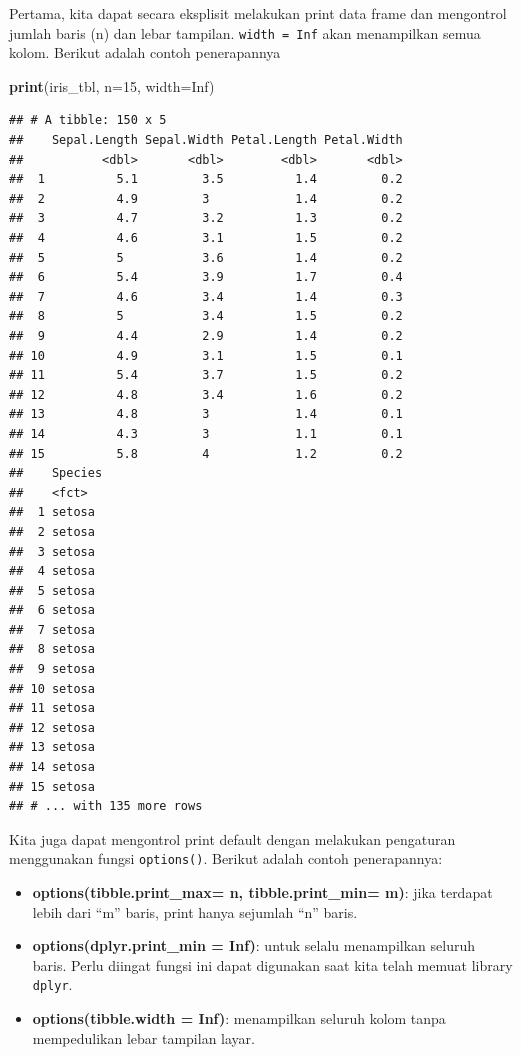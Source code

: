 \documentclass[]{book}
\newenvironment{Shaded}{\begin{snugshade}}{\end{snugshade}}
\newcommand{\KeywordTok}[1]{\textcolor[rgb]{0.13,0.29,0.53}{\textbf{#1}}}
\newcommand{\DataTypeTok}[1]{\textcolor[rgb]{0.13,0.29,0.53}{#1}}
\newcommand{\DecValTok}[1]{\textcolor[rgb]{0.00,0.00,0.81}{#1}}
\newcommand{\OtherTok}[1]{\textcolor[rgb]{0.56,0.35,0.01}{#1}}
\newcommand{\NormalTok}[1]{#1}
\providecommand{\tightlist}{%
  \setlength{\itemsep}{0pt}\setlength{\parskip}{0pt}}
\begin{document}
Pertama, kita dapat secara eksplisit melakukan print data frame dan
mengontrol jumlah baris (n) dan lebar tampilan. \texttt{width\ =\ Inf}
akan menampilkan semua kolom. Berikut adalah contoh penerapannya

\begin{Shaded}
\begin{Highlighting}[]
\KeywordTok{print}\NormalTok{(iris_tbl, }\DataTypeTok{n=}\DecValTok{15}\NormalTok{, }\DataTypeTok{width=}\OtherTok{Inf}\NormalTok{)}
\end{Highlighting}
\end{Shaded}

\begin{verbatim}
## # A tibble: 150 x 5
##    Sepal.Length Sepal.Width Petal.Length Petal.Width
##           <dbl>       <dbl>        <dbl>       <dbl>
##  1          5.1         3.5          1.4         0.2
##  2          4.9         3            1.4         0.2
##  3          4.7         3.2          1.3         0.2
##  4          4.6         3.1          1.5         0.2
##  5          5           3.6          1.4         0.2
##  6          5.4         3.9          1.7         0.4
##  7          4.6         3.4          1.4         0.3
##  8          5           3.4          1.5         0.2
##  9          4.4         2.9          1.4         0.2
## 10          4.9         3.1          1.5         0.1
## 11          5.4         3.7          1.5         0.2
## 12          4.8         3.4          1.6         0.2
## 13          4.8         3            1.4         0.1
## 14          4.3         3            1.1         0.1
## 15          5.8         4            1.2         0.2
##    Species
##    <fct>  
##  1 setosa 
##  2 setosa 
##  3 setosa 
##  4 setosa 
##  5 setosa 
##  6 setosa 
##  7 setosa 
##  8 setosa 
##  9 setosa 
## 10 setosa 
## 11 setosa 
## 12 setosa 
## 13 setosa 
## 14 setosa 
## 15 setosa 
## # ... with 135 more rows
\end{verbatim}

Kita juga dapat mengontrol print default dengan melakukan pengaturan
menggunakan fungsi \texttt{options()}. Berikut adalah contoh
penerapannya:

\begin{itemize}
\tightlist
\item
  \textbf{options(tibble.print\_max= n, tibble.print\_min= m)}: jika
  terdapat lebih dari ``m'' baris, print hanya sejumlah ``n'' baris.
\item
  \textbf{options(dplyr.print\_min = Inf)}: untuk selalu menampilkan
  seluruh baris. Perlu diingat fungsi ini dapat digunakan saat kita
  telah memuat library \texttt{dplyr}.
\item
  \textbf{options(tibble.width = Inf)}: menampilkan seluruh kolom tanpa
  mempedulikan lebar tampilan layar.
\end{itemize}
\end{document}
